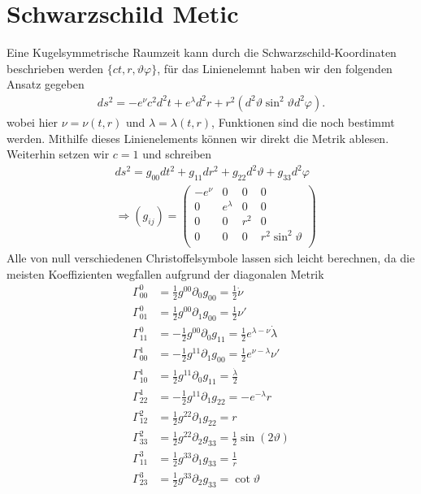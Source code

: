 \documentclass[a4paper]{article}
\begin{document}
\section{Schwarzschild Metic}
Eine Kugelsymmetrische Raumzeit kann durch die Schwarzschild-Koordinaten
beschrieben werden $\{ct, r, \vartheta \varphi\}$, für das Linienelemnt haben
wir den folgenden Ansatz gegeben
\begin{align}
    ds^2 = -e^\nu c^2 d^2t + e^\lambda d^2r + r^2(d^2\vartheta
    \sin^2\vartheta d^2\varphi).
\end{align}
wobei hier $\nu = \nu(t, r)$ und $\lambda = \lambda(t, r)$, Funktionen sind
die noch bestimmt werden. Mithilfe dieses Linienelements
können wir direkt die Metrik ablesen. Weiterhin setzen wir $c=1$ und
schreiben
\begin{align}
    &ds^2 = g_{00} dt^2 + g_{11} dr^2 + g_{22} d^2\vartheta + g_{33}
    d^2\varphi
    \nonumber \\
    &\Rightarrow (g_{ij}) =
    \begin{pmatrix}
        -e^\nu & 0 & 0 & 0  \\
        0 & e^\lambda & 0 & 0  \\
        0 & 0 & r^2 & 0  \\
        0 & 0 & 0 & r^2\sin^2\vartheta  \\
    \end{pmatrix}
\end{align}
Alle von null verschiedenen Christoffelsymbole lassen sich leicht berechnen,
da die meisten Koeffizienten wegfallen aufgrund der diagonalen Metrik
\begin{align}
    \Gamma^{0}_{00} &= \frac{1}{2} g^{00}\partial_0 g_{00} = \frac{1}{2}
    \dot{\nu}\\
    \Gamma^{0}_{01} &= \frac{1}{2} g^{00}\partial_1 g_{00} = \frac{1}{2}
    \nu'\\
    \Gamma^{0}_{11} &= -\frac{1}{2} g^{00}\partial_0 g_{11} = \frac{1}{2}
    e^{\lambda - \nu} \dot{\lambda}\\
    \Gamma^{1}_{00} &= -\frac{1}{2} g^{11}\partial_1 g_{00} = \frac{1}{2}
    e^{\nu -\lambda} \nu'\\
    \Gamma^{1}_{10} &= \frac{1}{2} g^{11}\partial_0 g_{11} =
    \frac{\dot{\lambda}}{2}\\
    \Gamma^1_{22} &= -\frac{1}{2} g^{11} \partial_1 g_{22} = -e^{-\lambda}
    r\\
    \Gamma^{2}_{12} &= \frac{1}{2} g^{22} \partial_1 g_{22} = r\\
    \Gamma^{2}_{33} &= \frac{1}{2} g^{22} \partial_2 g_{33} =
    \frac{1}{2}\sin(2\vartheta)\\
    \Gamma^{3}_{11} &= \frac{1}{2} g^{33} \partial_1 g_{33} = \frac{1}{r}\\
    \Gamma^{3}_{23} &= \frac{1}{2} g^{33}\partial_2 g_{33} = \cot\vartheta
\end{align}
\end{document}
